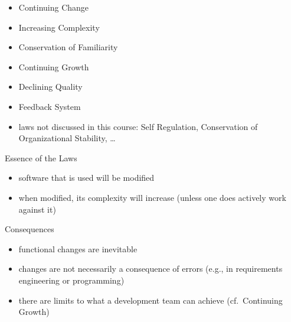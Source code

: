 
\begin{frame}{\insertsubsection{} \mytitlesource{\lehmanslaws, \sommerville}}
	\begin{fancycolumns}
		\begin{definition}{\insertsubsection}
			\begin{itemize}
				\item Continuing Change
				\item Increasing Complexity
				\item Conservation of Familiarity
				\item Continuing Growth
				\item Declining Quality
				\item Feedback System
				\item laws not discussed in this course: Self Regulation, Conservation of Organizational Stability, \ldots
			\end{itemize}
		\end{definition}
		\nextcolumn
		\begin{note}{Essence of the Laws}
			\begin{itemize}
				\item software that is used will be modified
				\item when modified, its complexity will increase (unless one does actively work against it)
			\end{itemize}
		\end{note}
		\begin{example}{Consequences}
			\begin{itemize}
				\item functional changes are inevitable
				\item changes are not necessarily a consequence of errors (e.g., in requirements engineering or programming)
				\item there are limits to what a development team can achieve (cf.\ Continuing Growth)
			\end{itemize}
		\end{example}
	\end{fancycolumns}
\end{frame}

